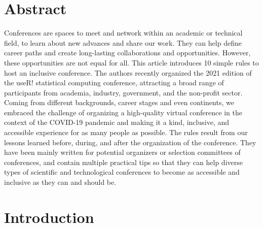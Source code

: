\documentclass[10pt,letterpaper]{article}
\begin{document}
\section*{Abstract}

Conferences are spaces to meet and network within an academic or technical field, to learn about new advances and share our work. They can help define career paths and create long-lasting collaborations and opportunities. 
However, these opportunities are not equal for all. 
This article introduces 10 simple rules to host an inclusive conference. 
The authors recently organized the 2021 edition of the useR! statistical computing conference, attracting a broad range of participants from academia, industry, government, and the non-profit sector. 
Coming from different backgrounds, career stages and even continents, we embraced the challenge of organizing a high-quality virtual conference in the context of the COVID-19 pandemic and making it a kind, inclusive, and accessible experience for as many people as possible.
The rules result from our lessons learned before, during, and after the organization of the conference. 
They have been mainly written for potential organizers or selection committees of conferences, and contain multiple practical tips so that they can help diverse types of scientific and technological conferences to become as accessible and inclusive as they can and should be.



\linenumbers

\section*{Introduction}
\end{document}
